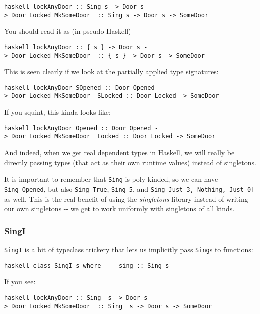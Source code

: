 \documentclass[]{article}
\begin{document}
\texttt{haskell\ lockAnyDoor\ ::\ Sing\ s\ -\textgreater{}\ Door\ s\ -\textgreater{}\ Door\ \textquotesingle{}Locked\ MkSomeDoor\ \ ::\ Sing\ s\ -\textgreater{}\ Door\ s\ -\textgreater{}\ SomeDoor}

You should read it as (in pseudo-Haskell)

\texttt{haskell\ lockAnyDoor\ ::\ \{\ s\ \}\ -\textgreater{}\ Door\ s\ -\textgreater{}\ Door\ \textquotesingle{}Locked\ MkSomeDoor\ \ ::\ \{\ s\ \}\ -\textgreater{}\ Door\ s\ -\textgreater{}\ SomeDoor}

This is seen clearly if we look at the partially applied type signatures:

\texttt{haskell\ lockAnyDoor\ SOpened\ ::\ Door\ \textquotesingle{}Opened\ -\textgreater{}\ Door\ \textquotesingle{}Locked\ MkSomeDoor\ \ SLocked\ ::\ Door\ \textquotesingle{}Locked\ -\textgreater{}\ SomeDoor}

If you squint, this kinda looks like:

\texttt{haskell\ lockAnyDoor\ \textquotesingle{}Opened\ ::\ Door\ \textquotesingle{}Opened\ -\textgreater{}\ Door\ \textquotesingle{}Locked\ MkSomeDoor\ \ \textquotesingle{}Locked\ ::\ Door\ \textquotesingle{}Locked\ -\textgreater{}\ SomeDoor}

And indeed, when we get real dependent types in Haskell, we will really be
directly passing types (that act as their own runtime values) instead of
singletons.

It is important to remember that \texttt{Sing} is poly-kinded, so we can have
\texttt{Sing\ \textquotesingle{}Opened}, but also
\texttt{Sing\ \textquotesingle{}True}, \texttt{Sing\ 5}, and
\texttt{Sing\ \textquotesingle{}{[}\textquotesingle{}Just\ 3,\ \textquotesingle{}Nothing,\ \textquotesingle{}Just\ 0{]}}
as well. This is the real benefit of using the \emph{singletons} library instead
of writing our own singletons -\/- we get to work uniformly with singletons of
all kinds.

\subsubsection{SingI}

\texttt{SingI} is a bit of typeclass trickery that lets us implicitly pass
\texttt{Sing}s to functions:

\texttt{haskell\ class\ SingI\ s\ where\ \ \ \ \ sing\ ::\ Sing\ s}

If you see:

\texttt{haskell\ lockAnyDoor\ ::\ Sing\ \ s\ -\textgreater{}\ Door\ s\ -\textgreater{}\ Door\ \textquotesingle{}Locked\ MkSomeDoor\ \ ::\ Sing\ \ s\ -\textgreater{}\ Door\ s\ -\textgreater{}\ SomeDoor}
\end{document}
